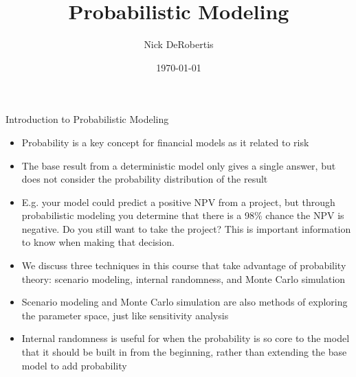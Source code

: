 \documentclass[]{article}
\begin{document}
\title{Probabilistic Modeling}
\author{Nick DeRobertis}
\date{\today}
\maketitle
\begin{section}{Introduction to Probabilistic Modeling}
\begin{itemize}
\item Probability is a key concept for financial models as it related to risk
\item The base result from a deterministic model only gives a single answer, but does not consider the probability distribution of the result
\item E.g. your model could predict a positive NPV from a project, but through probabilistic modeling you determine that there is a 98\% chance the NPV is negative. Do you still want to take the project? This is important information to know when making that decision.
\item We discuss three techniques in this course that take advantage of probability theory: scenario modeling, internal randomness, and Monte Carlo simulation
\item Scenario modeling and Monte Carlo simulation are also methods of exploring the parameter space, just like sensitivity analysis
\item Internal randomness is useful for when the probability is so core to the model that it should be built in from the beginning, rather than extending the base model to add probability
\end{itemize}
\end{section}
\end{document}
